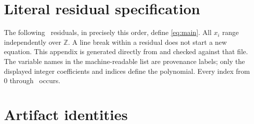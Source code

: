 \documentclass[11pt,letterpaper]{article}
\theoremstyle{definition}\newtheorem{definition}[theorem]{Definition}
\theoremstyle{remark}\newtheorem{remark}[theorem]{Remark}
\newcommand{\Z}{\mathbb Z}\newcommand{\N}{\mathbb N}
\begin{document}
\appendix
\clearpage
\section{Literal residual specification}\label{app:residuals}
The following \NumRows\ residuals, in precisely this order, define
\eqref{eq:main}. All \(x_i\) range independently over \(\Z\). A line
break within a residual does not start a new equation. This appendix is
generated directly from  and checked against
that file. The variable names in the machine-readable list are provenance
labels; only the displayed integer coefficients and indices define the
polynomial. Every index from 0 through \LastVar\ occurs.


\clearpage
\section{Artifact identities}

\end{document}
